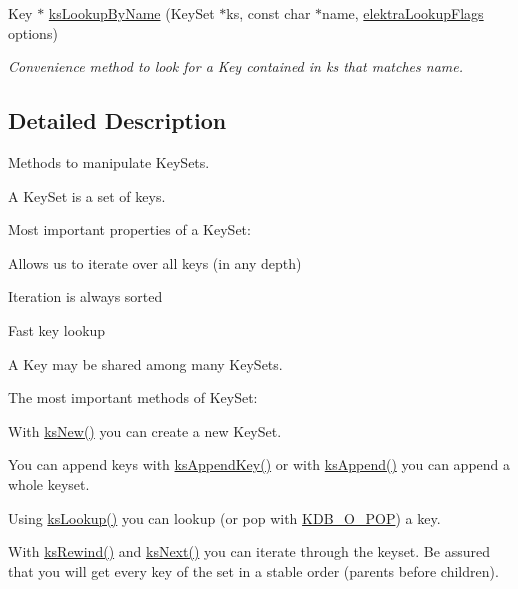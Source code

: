\begin{DoxyCompactItemize}
Key $\ast$ \hyperlink{group__keyset_gad65d2cdcbb5381194a1688e169af8a83}{ks\+Lookup\+By\+Name} (Key\+Set $\ast$ks, const char $\ast$name, \hyperlink{group__keyset_gada05f4bbf46fde81d0d57df86e73d914}{elektra\+Lookup\+Flags} options)
\begin{DoxyCompactList}\small\item\em Convenience method to look for a Key contained in {\ttfamily ks} that matches {\ttfamily name}. \end{DoxyCompactList}\end{DoxyCompactItemize}


\subsection{Detailed Description}
Methods to manipulate Key\+Sets. 

A Key\+Set is a set of keys.

Most important properties of a Key\+Set\+:


\begin{DoxyItemize}
\item Allows us to iterate over all keys (in any depth)
\item Iteration is always sorted
\item Fast key lookup
\item A Key may be shared among many Key\+Sets.
\end{DoxyItemize}

The most important methods of Key\+Set\+:


\begin{DoxyItemize}
\item With \hyperlink{group__keyset_ga671e1aaee3ae9dc13b4834a4ddbd2c3c}{ks\+New()} you can create a new Key\+Set.
\item You can append keys with \hyperlink{group__keyset_gaa5a1d467a4d71041edce68ea7748ce45}{ks\+Append\+Key()} or with \hyperlink{group__keyset_ga21eb9c3a14a604ee3a8bdc779232e7b7}{ks\+Append()} you can append a whole keyset.
\item Using \hyperlink{group__keyset_ga60f1ddcf23272f2b29b90e92ebe9b56f}{ks\+Lookup()} you can lookup (or pop with \hyperlink{group__keyset_ggada05f4bbf46fde81d0d57df86e73d914a52fb5f2cc86773d393da62bebebf7984}{K\+D\+B\+\_\+\+O\+\_\+\+P\+OP}) a key.
\item With \hyperlink{group__keyset_gabe793ff51f1728e3429c84a8a9086b70}{ks\+Rewind()} and \hyperlink{group__keyset_ga317321c9065b5a4b3e33fe1c399bcec9}{ks\+Next()} you can iterate through the keyset. Be assured that you will get every key of the set in a stable order (parents before children).
\end{DoxyItemize}

